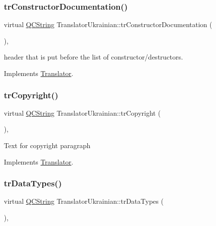 \subsubsection{\texorpdfstring{trConstructorDocumentation()}{trConstructorDocumentation()}}
{\footnotesize\ttfamily virtual \mbox{\hyperlink{class_q_c_string}{Q\+C\+String}} Translator\+Ukrainian\+::tr\+Constructor\+Documentation (\begin{DoxyParamCaption}{ }\end{DoxyParamCaption})\hspace{0.3cm}{\ttfamily [inline]}, {\ttfamily [virtual]}}

header that is put before the list of constructor/destructors. 

Implements \mbox{\hyperlink{class_translator}{Translator}}.

\mbox{\label{class_translator_ukrainian_ac4d1fb2ef4b346e0d8c210f214b35fe8}} 
\subsubsection{\texorpdfstring{trCopyright()}{trCopyright()}}
{\footnotesize\ttfamily virtual \mbox{\hyperlink{class_q_c_string}{Q\+C\+String}} Translator\+Ukrainian\+::tr\+Copyright (\begin{DoxyParamCaption}{ }\end{DoxyParamCaption})\hspace{0.3cm}{\ttfamily [inline]}, {\ttfamily [virtual]}}

Text for copyright paragraph 

Implements \mbox{\hyperlink{class_translator}{Translator}}.

\mbox{\label{class_translator_ukrainian_a1a0c0ccc6fae9ee0721944e4f53738c1}} 
\subsubsection{\texorpdfstring{trDataTypes()}{trDataTypes()}}
{\footnotesize\ttfamily virtual \mbox{\hyperlink{class_q_c_string}{Q\+C\+String}} Translator\+Ukrainian\+::tr\+Data\+Types (\begin{DoxyParamCaption}{ }\end{DoxyParamCaption})\hspace{0.3cm}{\ttfamily [inline]}, {\ttfamily [virtual]}}

